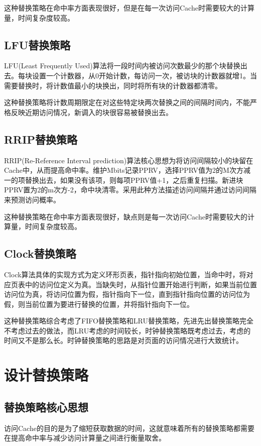 \documentclass{article}
\begin{document}
这种替换策略在命中率方面表现很好，但是在每一次访问Cache时需要较大的计算量，时间复杂度较高。

\subsection{LFU替换策略}
LFU(Least Frequently Used)算法将一段时间内被访问次数最少的那个块替换出去。每块设置一个计数器，从0开始计数，每访问一次，被访块的计数器就增1。当需要替换时，将计数值最小的块换出，同时将所有块的计数器都清零。

这种替换策略将计数周期限定在对这些特定块两次替换之间的间隔时间内，不能严格反映近期访问情况，新调入的块很容易被替换出去。

\subsection{RRIP替换策略}
RRIP(Re-Reference Interval prediction)算法核心思想为将访问间隔较小的块留在Cache中，从而提高命中率。维护Mbits记录PPRV，选择PPRV值为2的M次方减一的项替换出去，如果没有该项，则每项PPRV值+1，之后重复扫描。新进块PPRV置为2的m次方-2，命中块清零。采用此种方法描述访问间隔并通过访问间隔来预测访问概率。

这种替换策略在命中率方面表现很好，缺点则是每一次访问Cache时需要较大的计算量，时间复杂度较高。

\subsection{Clock替换策略}
Clock算法具体的实现方式为定义环形页表，指针指向初始位置，当命中时，将对应页表中的访问位定义为真。当缺失时，从指针位置开始进行判断，如果当前位置访问位为真，将访问位置为假，指针指向下一位，直到指针指向位置的访问位为假，则当前位置为要进行替换的位置，并将指针指向下一位。

这种替换策略综合考虑了FIFO替换策略和LRU替换策略，先进先出替换策略完全不考虑过去的做法，而LRU考虑的时间较长，时钟替换策略既考虑过去，考虑的时间又不是那么长。时钟替换策略的思路是对页面的访问情况进行大致统计。

\section{设计替换策略}
\subsection{替换策略核心思想}
访问Cache的目的是为了缩短获取数据的时间，这就意味着所有的替换策略都需要在提高命中率与减少访问计算量之间进行衡量取舍。
\end{document}
